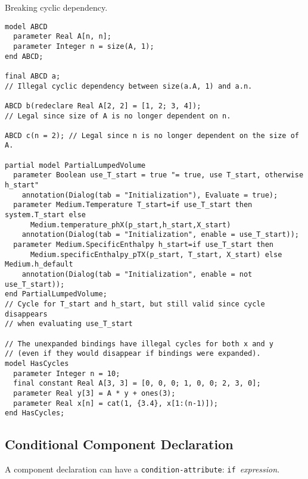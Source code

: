 \begin{example}
Breaking cyclic dependency.
\begin{lstlisting}[language=modelica]
model ABCD
  parameter Real A[n, n];
  parameter Integer n = size(A, 1);
end ABCD;

final ABCD a;
// Illegal cyclic dependency between size(a.A, 1) and a.n.

ABCD b(redeclare Real A[2, 2] = [1, 2; 3, 4]);
// Legal since size of A is no longer dependent on n.

ABCD c(n = 2); // Legal since n is no longer dependent on the size of A.

partial model PartialLumpedVolume
  parameter Boolean use_T_start = true "= true, use T_start, otherwise h_start"
    annotation(Dialog(tab = "Initialization"), Evaluate = true);
  parameter Medium.Temperature T_start=if use_T_start then system.T_start else
      Medium.temperature_phX(p_start,h_start,X_start)
    annotation(Dialog(tab = "Initialization", enable = use_T_start));
  parameter Medium.SpecificEnthalpy h_start=if use_T_start then
      Medium.specificEnthalpy_pTX(p_start, T_start, X_start) else Medium.h_default
    annotation(Dialog(tab = "Initialization", enable = not use_T_start));
end PartialLumpedVolume;
// Cycle for T_start and h_start, but still valid since cycle disappears
// when evaluating use_T_start

// The unexpanded bindings have illegal cycles for both x and y
// (even if they would disappear if bindings were expanded).
model HasCycles
  parameter Integer n = 10;
  final constant Real A[3, 3] = [0, 0, 0; 1, 0, 0; 2, 3, 0];
  parameter Real y[3] = A * y + ones(3);
  parameter Real x[n] = cat(1, {3.4}, x[1:(n-1)]);
end HasCycles;
\end{lstlisting}
\end{example}


\subsection{Conditional Component Declaration}\label{conditional-component-declaration}

A component declaration can have a \lstinline!condition-attribute!: \lstinline!if!~\emph{expression}.

